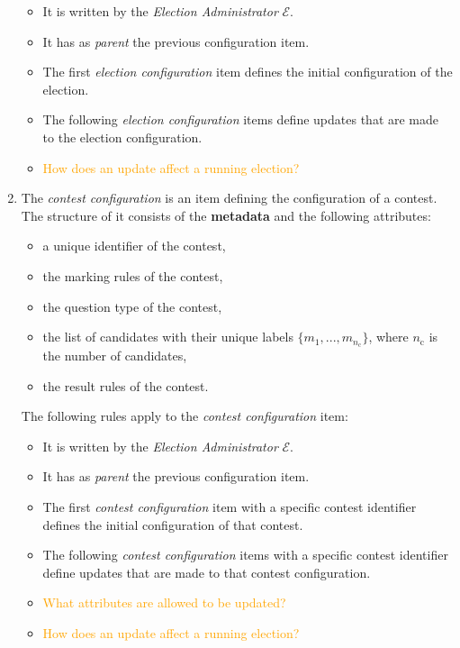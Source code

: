 \begin{enumerate}
        \begin{itemize}
            \item It is written by the \textit{Election Administrator} $\mathcal{E}$.
            \item It has as \textit{parent} the previous configuration item.
            \item The first \textit{election configuration} item defines the initial configuration of the election.
            \item The following \textit{election configuration} items define updates that are made to the election configuration.
            \item \textcolor{orange}{How does an update affect a running election?}
        \end{itemize}
    
    \item 
        The \textit{contest configuration} is an item defining the configuration of a contest. The structure of it consists of the \textbf{metadata} and the following attributes:
        \begin{itemize}
            \item a unique identifier of the contest,
            \item the marking rules of the contest,
            \item the question type of the contest,
            \item the list of candidates with their unique labels $\{m_1, ..., m_{n_\mathrm{c}}\}$, where $n_\mathrm{c}$ is the number of candidates,
            \item the result rules of the contest.
        \end{itemize}
        The following rules apply to the \textit{contest configuration} item:
        \begin{itemize}
            \item It is written by the \textit{Election Administrator} $\mathcal{E}$.
            \item It has as \textit{parent} the previous configuration item.
            \item The first \textit{contest configuration} item with a specific contest identifier defines the initial configuration of that contest.
            \item The following \textit{contest configuration} items with a specific contest identifier define updates that are made to that contest configuration.
            \item \textcolor{orange}{What attributes are allowed to be updated?}
            \item \textcolor{orange}{How does an update affect a running election?}
        \end{itemize}
        

\end{enumerate}
